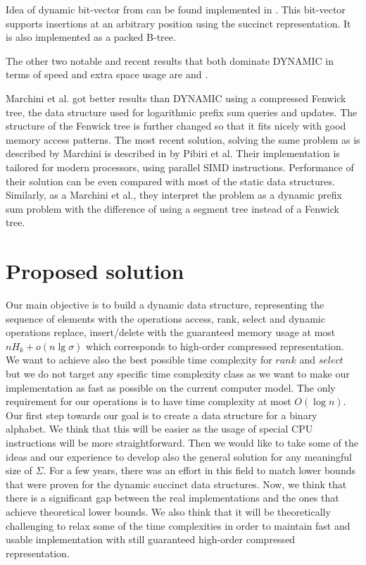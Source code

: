 Idea of dynamic bit-vector from \cite{policriti2015average} can be found implemented in \cite{ds-bitvector}. This bit-vector supports insertions at an arbitrary position using the succinct representation. It is also implemented as a packed B-tree.

The other two notable and recent results that both dominate DYNAMIC in terms of speed and extra space usage are \cite{marchini2020compact} and \cite{pibiri2020rank}.

Marchini et al. got better results than DYNAMIC using a compressed Fenwick tree\cite{marchini2020compact}, the data structure used for logarithmic prefix sum queries and updates\cite{fenwick1994new}. The structure of the Fenwick tree is further changed so that it fits nicely with good memory access patterns. The most recent solution, solving the same problem as is described by Marchini is described in \cite{pibiri2020rank} by Pibiri et al. Their implementation is tailored for modern processors, using parallel SIMD instructions. Performance of their solution can be even compared with most of the static data structures. Similarly, as a Marchini et al., they interpret the problem as a dynamic prefix sum problem with the difference of using a segment tree instead of a Fenwick tree.

\section{Proposed solution}

Our main objective is to build a dynamic data structure, representing the sequence of elements with the operations access, rank, select and dynamic operations replace, insert/delete with the guaranteed memory usage at most $nH_k+o(n\lg\sigma)$ which corresponds to high-order compressed representation. We want to achieve also the best possible time complexity for $rank$ and $select$ but we do not target any specific time complexity class as we want to make our implementation as fast as possible on the current computer model. The only requirement for our operations is to have time complexity at most $O(\log n)$. Our first step towards our goal is to create a data structure for a binary alphabet. We think that this will be easier as the usage of special CPU instructions will be more straightforward. Then we would like to take some of the ideas and our experience to develop also the general solution for any meaningful size of $\Sigma$. For a few years, there was an effort in this field to match lower bounds that were proven for the dynamic succinct data structures. Now, we think that there is a significant gap between the real implementations and the ones that achieve theoretical lower bounds. We also think that it will be theoretically challenging to relax some of the time complexities in order to maintain fast and usable implementation with still guaranteed high-order compressed representation.
